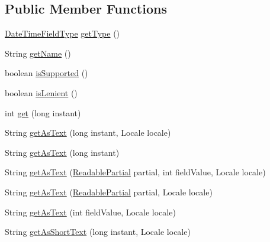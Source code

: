 \subsection*{Public Member Functions}
\begin{DoxyCompactItemize}
\item 
\hyperlink{classorg_1_1joda_1_1time_1_1_date_time_field_type}{Date\-Time\-Field\-Type} \hyperlink{classorg_1_1joda_1_1time_1_1field_1_1_unsupported_date_time_field_abef8b7f4f1f0f199f62c768f11f40eb4}{get\-Type} ()
\item 
String \hyperlink{classorg_1_1joda_1_1time_1_1field_1_1_unsupported_date_time_field_a1b1abc5c400b190358cfd46e5ac28b04}{get\-Name} ()
\item 
boolean \hyperlink{classorg_1_1joda_1_1time_1_1field_1_1_unsupported_date_time_field_a2b38b93d80c89b2b80ea246443c682ca}{is\-Supported} ()
\item 
boolean \hyperlink{classorg_1_1joda_1_1time_1_1field_1_1_unsupported_date_time_field_adaedf453964e7a748385b9cfd9df4aaf}{is\-Lenient} ()
\item 
int \hyperlink{classorg_1_1joda_1_1time_1_1field_1_1_unsupported_date_time_field_a3758edd6f1a962593a62d1cadadff53f}{get} (long instant)
\item 
String \hyperlink{classorg_1_1joda_1_1time_1_1field_1_1_unsupported_date_time_field_a3002905b9ec1a5d6857248aec045d2d4}{get\-As\-Text} (long instant, Locale locale)
\item 
String \hyperlink{classorg_1_1joda_1_1time_1_1field_1_1_unsupported_date_time_field_a2b04ac93996f9b3b85a49782d2d7fea2}{get\-As\-Text} (long instant)
\item 
String \hyperlink{classorg_1_1joda_1_1time_1_1field_1_1_unsupported_date_time_field_a933ce47e5b094b4ac8ad81c15837d48d}{get\-As\-Text} (\hyperlink{interfaceorg_1_1joda_1_1time_1_1_readable_partial}{Readable\-Partial} partial, int field\-Value, Locale locale)
\item 
String \hyperlink{classorg_1_1joda_1_1time_1_1field_1_1_unsupported_date_time_field_a3e559c15529ec7f1705c5ec1537a75bf}{get\-As\-Text} (\hyperlink{interfaceorg_1_1joda_1_1time_1_1_readable_partial}{Readable\-Partial} partial, Locale locale)
\item 
String \hyperlink{classorg_1_1joda_1_1time_1_1field_1_1_unsupported_date_time_field_ad4ce07b6b0c0843209255a9b374f2179}{get\-As\-Text} (int field\-Value, Locale locale)
\item 
String \hyperlink{classorg_1_1joda_1_1time_1_1field_1_1_unsupported_date_time_field_ab38ab4a3215eac71158f96479013e6c8}{get\-As\-Short\-Text} (long instant, Locale locale)

\end{DoxyCompactItemize}
